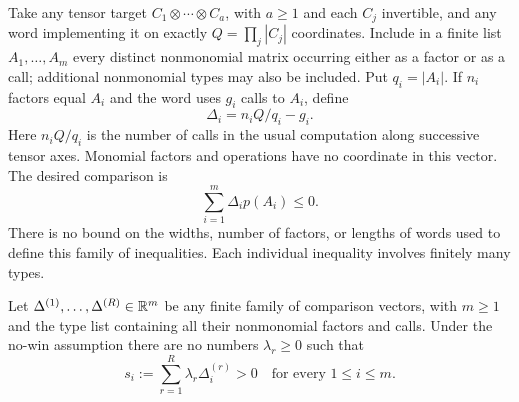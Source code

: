 Take any tensor target
\(C_1\otimes\cdots\otimes C_a\), with \(a\geq1\) and each \(C_j\)
invertible, and any word implementing it on exactly
\(Q=\prod_j|C_j|\) coordinates.  Include in a finite list
\(A_1,\ldots,A_m\) every distinct nonmonomial matrix occurring either as a
factor or as a call; additional nonmonomial types may also be included.
Put \(q_i=|A_i|\).  If \(n_i\) factors equal \(A_i\) and the word uses
\(g_i\) calls to \(A_i\), define
\begin{equation}
 \Delta_i=n_iQ/q_i-g_i.
 \label{price:comparison-vector}
\end{equation}
Here \(n_iQ/q_i\) is the number of calls in the usual computation along
successive tensor axes.  Monomial factors and operations have no coordinate
in this vector.  The desired comparison is
\begin{equation}
 \sum_{i=1}^m\Delta_i p(A_i)\leq0.
 \label{price:comparison}
\end{equation}
There is no bound on the widths, number of factors, or lengths of words
used to define this family of inequalities.  Each individual inequality
involves finitely many types.

\begin{lemma}
\label{price:packing}
Let \(\Delta^{(1)},\ldots,\Delta^{(R)}\in\mathbb R^m\) be any finite family of
comparison vectors, with \(m\geq1\) and the type list containing all their
nonmonomial factors and calls.  Under the no-win assumption there are no
numbers \(\lambda_r\geq0\) such that
\[
 s_i:=\sum_{r=1}^R\lambda_r\Delta^{(r)}_i>0
 \quad\text{for every }1\leq i\leq m.
\]
\end{lemma}

